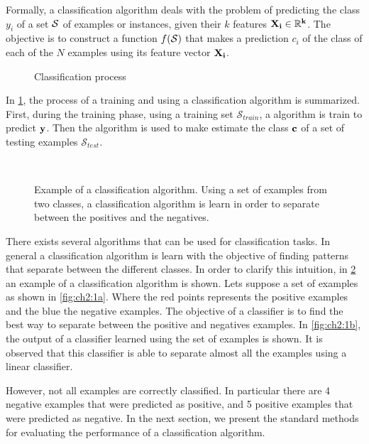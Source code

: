 Formally, a classification algorithm deals with the problem	of predicting the class $y_i$ of a 
set $\cal S$ of examples or instances, given their $k$ features \mbox{$\bf{X}_i \in 
\mathbb{R}^k$}. The objective is to construct a function $f(\cal{S})$ that makes a prediction 
$c_i$ of the class of each of the $N$ examples using its feature vector $\bf{X}_i$.
\label{ntn:ch2:1}

\begin{figure}
	\centering
	
  \caption{Classification process}
  \label{fig:ch2:0}
\end{figure}


In \figurename{ \ref{fig:ch2:0}}, the process of a training and using a classification algorithm is 
summarized. First, during the training phase, using a training set $\mathcal{S}_{train}$, a 
algorithm is train to predict $\bf y$. Then the algorithm is used to make estimate the class $\bf 
c$ of a set of testing examples $\mathcal{S}_{test}$.

\begin{figure}[!t]
\centering
{}
\\
\caption{Example of a classification algorithm. Using a set of examples from two classes, a 
	classification algorithm is learn in order to separate between the positives and the negatives. }
\label{fig:ch2:1}
\end{figure} 

There exists several algorithms that can be used for classification tasks. In general a 
classification algorithm is learn with the objective of finding patterns that separate between the 
different classes. In order to clarify this intuition, in \figurename{ \ref{fig:ch2:1}} an example 
of a classification algorithm is shown. Lets suppose a set of examples as shown in \figurename{ 
\ref{fig:ch2:1a}}.  Where the red points represents the positive examples and the blue the negative 
examples. The objective of a classifier is to find the best way to separate between the positive and 
negatives examples. In \figurename{ \ref{fig:ch2:1b}}, the output of a classifier learned using the 
set of examples is shown. It is observed that this classifier is able to separate almost all the 
examples using a linear classifier. 

However, not all examples are correctly classified. In particular there are 4 negative examples that 
were predicted as positive, and 5 positive examples that were predicted as negative. In the next 
section, we present the standard methods for evaluating the performance of a classification 
algorithm.

